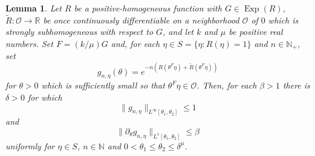 \documentclass[11pt]{article}
\newtheorem{lemma}[theorem]{Lemma}
\theoremstyle{remark}
\newcommand\Exp{\operatorname{Exp}}
\begin{document}
\begin{lemma}\label{lem:AmplitudeSobolevEstimates}
Let $R$ be a positive-homogeneous function with $G\in\Exp(R)$, $\widetilde{R}:\mathcal{O}\to\mathbb{R}$ be once continuously differentiable on a neighborhood $\mathcal{O}$ of $0$ which is strongly subhomogeneous with respect to $G$, and let $k$ and $\mu$ be positive real numbers. Set $F=(k/\mu) G$ and, for each $\eta\in S=\{\eta:R(\eta)=1\}$ and $n\in\mathbb{N}_+$, set
\begin{equation*}
    g_{n,\eta}(\theta)=e^{-n\left(R\left(\theta^F\eta\right)+\widetilde{R}\left(\theta^F\eta\right)\right)}
\end{equation*}
for $\theta>0$ which is sufficiently small so that $\theta^F\eta\in\mathcal{O}$. Then, for each $\beta>1$ there is $\delta>0$ for which 
\begin{equation*}
    \|g_{n,\eta}\|_{L^\infty[\theta_1,\theta_2]}\leq 1
\end{equation*}
and
\begin{equation*}
    \|\partial_\theta g_{n,\eta}\|_{L^1[\theta_1,\theta_2]}\leq \beta
\end{equation*}
uniformly for $\eta\in S$, $n\in\mathbb{N}$ and $0<\theta_1\leq\theta_2\leq \delta^{\mu}$.
\end{lemma}
\end{document}
